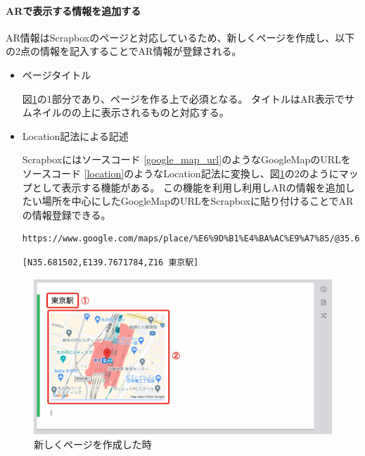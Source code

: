 \paragraph*{ARで表示する情報を追加する}
AR情報はScrapboxのページと対応しているため、新しくページを作成し、以下の2点の情報を記入することでAR情報が登録される。
\begin{itemize}
  \item ページタイトル
  
  図\ref{fig:scrapbox_ar_new}の\textcircled{\scriptsize{1}}部分であり、ページを作る上で必須となる。
  タイトルはAR表示でサムネイルのの上に表示されるものと対応する。

  \item Location記法による記述
  
  Scrapboxにはソースコード \ref{google_map_url}のようなGoogleMapのURLをソースコード \ref{location}のようなLocation記法に変換し、図\ref{fig:scrapbox_ar_new}の\textcircled{\scriptsize{2}}のようにマップとして表示する機能がある。
  この機能を利用し利用しARの情報を追加したい場所を中心にしたGoogleMapのURLをScrapboxに貼り付けることでARの情報登録できる。

  \begin{lstlisting}[caption=googleMapのURL, label=google_map_url]
    https://www.google.com/maps/place/%E6%9D%B1%E4%BA%AC%E9%A7%85/@35.681502,139.7671784,17z/data=!4m5!3m4!1s0x60188bfbd89f700b:0x277c49ba34ed38!8m2!3d35.6812362!4d139.7671248
  \end{lstlisting}

  \begin{lstlisting}[caption=Location記法, label=location]
    [N35.681502,E139.7671784,Z16 東京駅]
  \end{lstlisting}
\end{itemize}

\begin{figure}[htbp]
  \centering
  \includegraphics[width=120mm]{images/scrapbox_ar_new.png}
  \caption{新しくページを作成した時} \label{fig:scrapbox_ar_new}
\end{figure}

